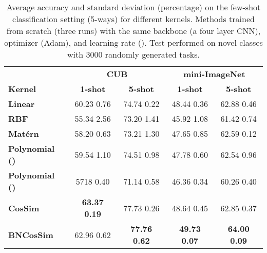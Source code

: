 \documentclass{article}
\begin{document}
\begin{table}[H]
\caption{Average accuracy and standard deviation (percentage) on the few-shot classification setting (5-ways) for different kernels. Methods trained from scratch (three runs) with the same backbone (a four layer CNN), optimizer (Adam), and learning rate (). Test performed on novel classes with 3000 randomly generated tasks.}
\centering
\begin{tabular}{lcccc}
\hline
\textbf{} & \multicolumn{2}{c}{\textbf{CUB}} & \multicolumn{2}{c}{\textbf{mini-ImageNet}} \\
\small{\textbf{Kernel}} & \textbf{1-shot} & \textbf{5-shot} & \textbf{1-shot} & \textbf{5-shot}\\
\hline
\small{\textbf{Linear}} & 60.23  \small{0.76} & 74.74  \small{0.22} & 48.44  \small{0.36} & 62.88  \small{0.46} \\
\small{\textbf{RBF}} & 55.34  \small{2.56} & 73.20  \small{1.41} & 45.92  \small{1.08} & 61.42  \small{0.74} \\
\small{\textbf{Mat\'ern}} & 58.20  \small{0.63} & 73.21  \small{1.30} & 47.65  \small{0.85} & 62.59  \small{0.12} \\
\small{\textbf{Polynomial ()}} & 59.54  \small{1.10} & 74.51  \small{0.98} & 47.78  \small{0.60} & 62.54  \small{0.96} \\
\small{\textbf{Polynomial ()}} & 5718  \small{0.40} & 71.14  \small{0.58} & 46.36  \small{0.34} & 60.26  \small{0.40} \\
\small{\textbf{CosSim}} & \textbf{63.37  \small{0.19}} & 77.73  \small{0.26} & 48.64  \small{0.45} & 62.85  \small{0.37} \\
\small{\textbf{BNCosSim}} & 62.96  \small{0.62} & \textbf{77.76  \small{0.62}} & \textbf{49.73  \small{0.07}} & \textbf{64.00  \small{0.09}} \\
\hline
\end{tabular}
\label{tab_classification_kernel_comparison}
\end{table}
\end{document}
